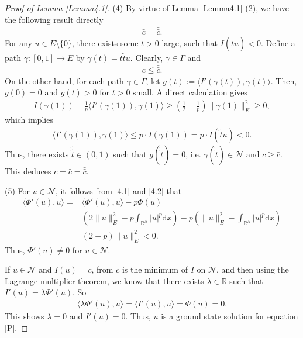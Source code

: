 \documentclass[10pt,a4paper]{amsart}
\begin{document}
\begin{proof}[Proof of Lemma \ref{Lemma4.1}]
(4)
By virtue of Lemma \ref{Lemma4.1} (2), we have the following result directly
\begin{equation*}
\begin{aligned}
\bar{c}=\bar{\bar{c}}.
\end{aligned}
\end{equation*}
For any $u\in E\setminus\{0\}$,
there exists some $\tilde{t}>0$ large,
such that $I(\tilde{t}u)<0$.
Define a path $\gamma:[0, 1]\to E$ by $\gamma(t) = t\tilde{t}u$.
Clearly, $\gamma\in\Gamma$ and
\begin{equation*}
\begin{aligned}
c\leqslant \bar{\bar{c}}.
\end{aligned}
\end{equation*}
On the other hand, for each path $\gamma\in\Gamma$,
let $g(t):=\langle I'(\gamma(t)),\gamma(t)\rangle$.
Then, $g(0)=0$ and $g(t)>0$ for $t>0$ small. A direct calculation gives
\begin{equation*}
\begin{aligned}
I(\gamma(1))
-\frac{1}{p}\langle I'(\gamma(1)),\gamma(1)\rangle
\geqslant\left(\frac{1}{2}-\frac{1}{p}\right)\|\gamma(1)\|_{E}^{2}
\geqslant 0,
\end{aligned}
\end{equation*}
which implies
\begin{equation*}
\begin{aligned}
\langle I'(\gamma(1)),\gamma(1)\rangle
\leqslant p\cdot I(\gamma(1))
=p\cdot I(\tilde{t}u)<0.
\end{aligned}
\end{equation*}
Thus, there exists $\tilde{\tilde{t}} \in(0,1)$ such that $g(\tilde{\tilde{t}}) = 0$, i.e. $\gamma(\tilde{\tilde{t}})\in \mathcal{N}$ and $c\geqslant \bar{c}$.
This deduces
$c=\bar{c}=\bar{\bar{c}}$.

(5)
For $u\in \mathcal{N}$, it follows from \eqref{4.1} and \eqref{4.2} that
\begin{equation*}
\begin{aligned}
\langle\Phi'(u),u\rangle
=&\langle\Phi'(u),u\rangle-p\Phi(u)\\
=&\left(2\|u\|_{E}^{2}-p\int_{\mathbb{R}^{N}}|u|^{p}\mathrm{d}x\right)
-p\left(\|u\|_{E}^{2}
-\int_{\mathbb{R}^{N}}|u|^{p}\mathrm{d}x\right)\\
=&(2-p)\|u\|_{E}^{2}
<0.
\end{aligned}
\end{equation*}
Thus, $\Phi'(u)\not=0$ for $u\in \mathcal{N}$.

If $u\in \mathcal{N}$ and $I(u)=\bar{c}$,
from $\bar{c}$ is the minimum of $I$ on $\mathcal{N}$,
and then using the Lagrange multiplier theorem, we know that there exists $\lambda\in \mathbb{R}$ such that $I'(u)=\lambda \Phi'(u)$. So
\begin{equation*}
\begin{aligned}
\langle \lambda \Phi'(u),u\rangle =\langle I'(u),u\rangle=\Phi(u)=0.
\end{aligned}
\end{equation*}
This shows $\lambda=0$ and $I'(u)=0$. Thus, $u$ is a ground state solution for equation \eqref{P}.
\end{proof}
\end{document}
